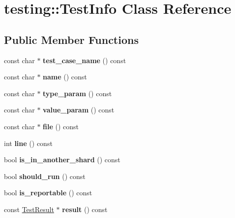 \hypertarget{classtesting_1_1TestInfo}{}\section{testing\+:\+:Test\+Info Class Reference}
\label{classtesting_1_1TestInfo}
\subsection*{Public Member Functions}
\begin{DoxyCompactItemize}
\item 
\mbox{\label{classtesting_1_1TestInfo_a036a20710c8c2252889544daba9a8ff9}} 
const char $\ast$ {\bfseries test\+\_\+case\+\_\+name} () const
\item 
\mbox{\label{classtesting_1_1TestInfo_ac2581b45eccc9a3b94cb41c4807d0e34}} 
const char $\ast$ {\bfseries name} () const
\item 
\mbox{\label{classtesting_1_1TestInfo_a7759bc57f4350ad406cbbb0b3bcea320}} 
const char $\ast$ {\bfseries type\+\_\+param} () const
\item 
\mbox{\label{classtesting_1_1TestInfo_abdf2c6cfcf4819e725816c64e1c1fc24}} 
const char $\ast$ {\bfseries value\+\_\+param} () const
\item 
\mbox{\label{classtesting_1_1TestInfo_a9b74d79cf618ce5bb0d0b1da75ee8b35}} 
const char $\ast$ {\bfseries file} () const
\item 
\mbox{\label{classtesting_1_1TestInfo_af5931cfc594b5d660c56b3c61c41ea13}} 
int {\bfseries line} () const
\item 
\mbox{\label{classtesting_1_1TestInfo_a8621f2cf7623fd1609db8e324f0c2fec}} 
bool {\bfseries is\+\_\+in\+\_\+another\+\_\+shard} () const
\item 
\mbox{\label{classtesting_1_1TestInfo_a866e33b5bc5ab2a6e5375fc7d3af0f96}} 
bool {\bfseries should\+\_\+run} () const
\item 
\mbox{\label{classtesting_1_1TestInfo_a63e7042028b0b846f4b5a1e5bcffc079}} 
bool {\bfseries is\+\_\+reportable} () const
\item 
\mbox{\label{classtesting_1_1TestInfo_aee8cb884c95cd446129aba936b4159e0}} 
const \hyperlink{classtesting_1_1TestResult}{Test\+Result} $\ast$ {\bfseries result} () const
\end{DoxyCompactItemize}
